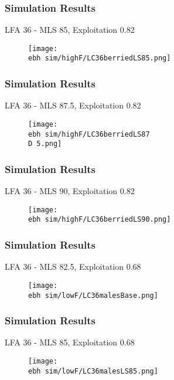 \documentclass{beamer}
\newcommand{\ebh}{/SpinDr/backup/bio_data/bio.lobster/figures/LFA3438Framework2019/Brad/} %
\newcommand{\D}{.}
\begin{document}
\begin{frame}
\frametitle{Simulation Results}
LFA 36 - MLS 85, Exploitation 0.82
\begin{figure}
        \begin{center}
            \texttt{[image: \\ebh sim/highF/LC36berriedLS85.png]}
        \end{center}
    \end{figure}
\end{frame}


\begin{frame}
\frametitle{Simulation Results}
LFA 36 - MLS 87.5, Exploitation 0.82
\begin{figure}
        \begin{center}
            \texttt{[image: \\ebh sim/highF/LC36berriedLS87\\D 5.png]}
        \end{center}
    \end{figure}
\end{frame}


\begin{frame}
\frametitle{Simulation Results}
LFA 36 - MLS 90, Exploitation 0.82
\begin{figure}
        \begin{center}
            \texttt{[image: \\ebh sim/highF/LC36berriedLS90.png]}
        \end{center}
    \end{figure}
\end{frame}



\begin{frame}
\frametitle{Simulation Results}
LFA 36 - MLS 82.5, Exploitation 0.68
\begin{figure}
        \begin{center}
            \texttt{[image: \\ebh sim/lowF/LC36malesBase.png]}
        \end{center}
    \end{figure}
\end{frame}



\begin{frame}
\frametitle{Simulation Results}
LFA 36 - MLS 85, Exploitation 0.68
\begin{figure}
        \begin{center}
            \texttt{[image: \\ebh sim/lowF/LC36malesLS85.png]}
        \end{center}
    \end{figure}
\end{frame}
\end{document}
